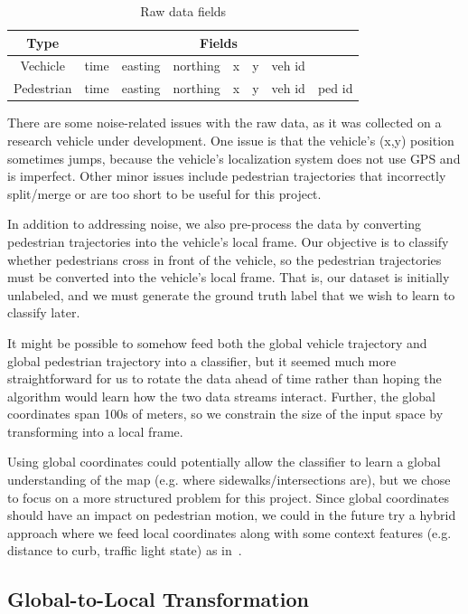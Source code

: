 \begin{table}[ht!]
\centering
\begin{tabular}{||c||c c c c c c c||}  
 \hline
 \multirow{1}{*}{Type} &
       \multicolumn{7}{c||}{Fields} \\
 \hline\hline
 Vechicle & time & easting & northing & x & y & veh id & \\ \hline
 Pedestrian & time & easting & northing & x & y & veh id & ped id \\ \hline
\end{tabular}
\caption{Raw data fields}
\label{table_data}
\end{table}

There are some noise-related issues with the raw data, as it was collected on a research vehicle under development.
One issue is that the vehicle's (x,y) position sometimes jumps, because the vehicle's localization system does not use GPS and is imperfect.
Other minor issues include pedestrian trajectories that incorrectly split/merge or are too short to be useful for this project.

In addition to addressing noise, we also pre-process the data by converting pedestrian trajectories into the vehicle's local frame.
Our objective is to classify whether pedestrians cross in front of the vehicle, so the pedestrian trajectories must be converted into the vehicle's local frame.
That is, our dataset is initially unlabeled, and we must generate the ground truth label that we wish to learn to classify later.

It might be possible to somehow feed both the global vehicle trajectory and global pedestrian trajectory into a classifier, but it seemed much more straightforward for us to rotate the data ahead of time rather than hoping the algorithm would learn how the two data streams interact.
Further, the global coordinates span 100s of meters, so we constrain the size of the input space by transforming into a local frame.

Using global coordinates could potentially allow the classifier to learn a global understanding of the map (e.g. where sidewalks/intersections are), but we chose to focus on a more structured problem for this project.
Since global coordinates should have an impact on pedestrian motion, we could in the future try a hybrid approach where we feed local coordinates along with some context features (e.g. distance to curb, traffic light state) as in~\cite{casnsc_NIPS}.

\subsection{Global-to-Local Transformation}

